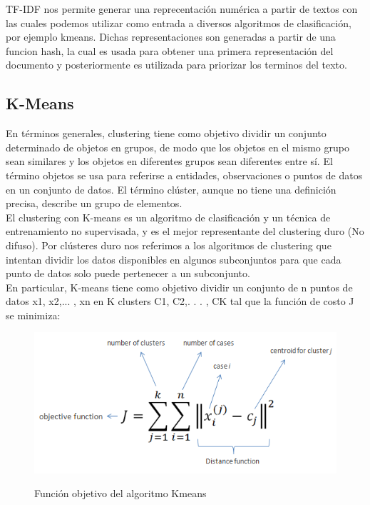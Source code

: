 \documentclass[conference,compsoc]{IEEEtran}
\begin{document}
TF-IDF nos permite generar una reprecentación numérica a partir de textos con
las cuales podemos utilizar como entrada a diversos algoritmos de
clasificación, por ejemplo kmeans. Dichas representaciones son generadas a
partir de una funcion hash, la cual es usada para obtener una primera
representación del documento y posteriormente es utilizada para priorizar los
terminos del texto.\\

\subsection{K-Means}
En términos generales, clustering tiene como objetivo dividir un conjunto
determinado de objetos en grupos, de modo que los objetos en el mismo grupo
sean similares y los objetos en diferentes grupos sean diferentes entre sí. El
término objetos se usa para referirse a entidades, observaciones o puntos de
datos en un conjunto de datos. El término clúster, aunque no tiene una
definición precisa, describe un grupo de elementos.\\

El clustering con K-means es un algoritmo de clasificación y un técnica de
entrenamiento no supervisada, y es el mejor representante del clustering duro
(No difuso). Por clústeres duro nos referimos a los algoritmos de clustering
que intentan dividir los datos disponibles en algunos subconjuntos para que
cada punto de datos solo puede pertenecer a un subconjunto.\\

En particular, K-means tiene como objetivo dividir un conjunto de n puntos de
datos x1, x2,... , xn en K clusters C1, C2,. . . , CK tal que la función de
costo J se minimiza:

\begin{figure}[H]
    \centering
    \includegraphics[scale=0.6]{kmeans.png}
    \caption{Función objetivo del algoritmo Kmeans} \cite{kmeans}
\end{figure}
\end{document}
